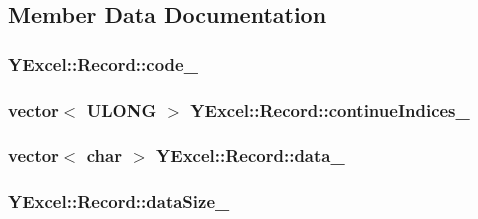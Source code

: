 \subsection{Member Data Documentation}
\hypertarget{class_y_excel_1_1_record_a09d4f522825ca080f13cef27e91a4029}{}
\subsubsection[{code\+\_\+}]{ Y\+Excel\+::\+Record\+::code\+\_\+}\label{class_y_excel_1_1_record_a09d4f522825ca080f13cef27e91a4029}
\hypertarget{class_y_excel_1_1_record_ad9cae1d6757196deb6ee916bd643fa4e}{}
\subsubsection[{continue\+Indices\+\_\+}]{\setlength{\rightskip}{0pt plus 5cm}vector$<$ {\bf U\+L\+O\+N\+G} $>$ Y\+Excel\+::\+Record\+::continue\+Indices\+\_\+}\label{class_y_excel_1_1_record_ad9cae1d6757196deb6ee916bd643fa4e}
\hypertarget{class_y_excel_1_1_record_a1285e95d5c34524d474768731d9b67b2}{}
\subsubsection[{data\+\_\+}]{\setlength{\rightskip}{0pt plus 5cm}vector$<$ char $>$ Y\+Excel\+::\+Record\+::data\+\_\+}\label{class_y_excel_1_1_record_a1285e95d5c34524d474768731d9b67b2}
\hypertarget{class_y_excel_1_1_record_a779cadbcd3bd561a07da5fa1d427658c}{}
\subsubsection[{data\+Size\+\_\+}]{ Y\+Excel\+::\+Record\+::data\+Size\+\_\+}\label{class_y_excel_1_1_record_a779cadbcd3bd561a07da5fa1d427658c}
\hypertarget{class_y_excel_1_1_record_a4d726030a31687be0637f0a51f5877dd}{}
